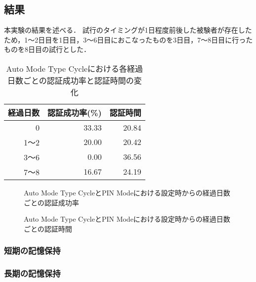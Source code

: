 \subsection{結果}
本実験の結果を述べる．
試行のタイミングが1日程度前後した被験者が存在したため，1〜2日目を1日目，3〜6日目におこなったものを3日目，7〜8日目に行ったものを8日目の試行とした．
\begin{table}[ht]
  \begin{center}
    \small
    \begin{tabular}{|r|r|r|} \hline
      経過日数 & 認証成功率(\%) & 認証時間\\ \hline
      0 & 33.33 & 20.84 \\
      1〜2 & 20.00 & 20.42 \\
      3〜6 & 0.00 & 36.56 \\
      7〜8 & 16.67 & 24.19 \\ \hline
    \end{tabular}
  \end{center}
  \caption{Auto Mode Type Cycleにおける各経過日数ごとの認証成功率と認証時間の変化}
  \label{tab:auto_cycle.data}
\end{table}

\begin{figure}[ht]
  \begin{center}
  \end{center}
  \caption{Auto Mode Type CycleとPIN Modeにおける設定時からの経過日数ごとの認証成功率}
  \label{fig:ex_auto_cycle_vs_pin_rate}
\end{figure}

\begin{figure}[ht]
  \begin{center}
  \end{center}
  \caption{Auto Mode Type CycleとPIN Modeにおける設定時からの経過日数ごとの認証時間}
  \label{fig:ex_auto_cycle_vs_pin_time}
\end{figure}

\subsubsection{短期の記憶保持}


\subsubsection{長期の記憶保持}


